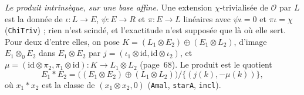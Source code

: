 \noindent\emph{Le produit intrinsèque, sur une base affine.} Une extension $\chi$-trivialisée de $\mathcal O$ par $L$ est la donnée de $\iota : L \to E$, $\psi : E \to R$ et $\pi : E \to L$ linéaires avec $\psi\iota = 0$ et $\pi\iota = \chi$ (\texttt{ChiTriv}) ; rien n'est scindé, et l'exactitude n'est supposée que là où elle sert. Pour deux d'entre elles, on pose $K = (L_1 \otimes E_2) \oplus (E_1 \otimes L_2)$, d'image $E_1 \otimes_0 E_2$ dans $E_1 \otimes E_2$ par $j = (\iota_1 \otimes \mathrm{id}, \mathrm{id} \otimes \iota_2)$, et $\mu = (\mathrm{id} \otimes \pi_2, \pi_1 \otimes \mathrm{id}) : K \to L_1 \otimes L_2$ (page~68). Le produit est le quotient
\[ E_1 * E_2 = \bigl((E_1 \otimes E_2) \oplus (L_1 \otimes L_2)\bigr) / \{(j(k), -\mu(k))\}, \]
où $x_1 * x_2$ est la classe de $(x_1 \otimes x_2, 0)$ (\texttt{Amal}, \texttt{starA}, \texttt{incl}).


